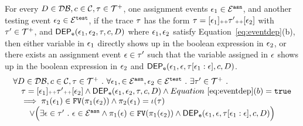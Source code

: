 \begin{lem}
	\label{lem:inv_indepevents_ctl}
	For every $D \in \mathcal{DB} , c \in \mathcal{C}, \mathtt{\tau} \in \mathcal{T}^{+}$, one assignment events 
	$\mathtt{\epsilon}_1\in \mathcal{E}^{\mathtt{{asn}}}$, and another testing event $\mathtt{\epsilon}_2 \in \mathcal{E}^{\mathtt{{test}}}$,
	if the trace $\mathtt{\tau}$ has the form $\mathtt{\tau} = [\mathtt{\epsilon}_1] {\scriptscriptstyle ++} \mathtt{\tau}' {\scriptscriptstyle ++} [\mathtt{\epsilon}_2]$ with $\mathtt{\tau}' \in \mathcal{T}^{+}$, 
	and $\mathsf{DEP_{\mathtt{e}}}(\mathtt{\epsilon}_1, \mathtt{\epsilon}_2, \mathtt{\tau}, c, D)$
	where $\mathtt{\epsilon}_1, \mathtt{\epsilon}_2$ satisfy Equation~\ref{eq:eventdep}(b),
	then either variable in $\mathtt{\epsilon}_1$ directly shows up in the boolean expression 
	in $\mathtt{\epsilon}_2$,
	or there exists an assignment event
	$\mathtt{\epsilon} \in \mathtt{\tau}'$ such that 
	the variable assigned in $\mathtt{\epsilon}$ shows up in the boolean expression 
	in $\mathtt{\epsilon}_2$ and
	$\mathsf{DEP_{\mathtt{e}}}(\mathtt{\epsilon}_1, \mathtt{\epsilon}, \mathtt{\tau}[\mathtt{\epsilon}_1:\mathtt{\epsilon}], c, D)$.
%
\[
\begin{array}{l}
	\forall D \in \mathcal{DB} , c \in \mathcal{C}, \mathtt{\tau} \in \mathcal{T}^{+} ~.~  \forall \mathtt{\epsilon}_1,\in \mathcal{E}^{\mathtt{{asn}}}, \mathtt{\epsilon}_2 \in \mathcal{E}^{\mathtt{{test}}} ~.~ 
	 \exists \mathtt{\tau}' \in \mathcal{T}^{+} ~.~
	 \\ \quad 
	 \mathtt{\tau} = [\mathtt{\epsilon}_1] {\scriptscriptstyle ++} \mathtt{\tau}' {\scriptscriptstyle ++} [\mathtt{\epsilon}_2]
	 \land
	\mathsf{DEP_{\mathtt{e}}}(\mathtt{\epsilon}_1, \mathtt{\epsilon}_2, \mathtt{\tau}, c, D) \land Equation~\ref{eq:eventdep}(b) = \mathtt{true}
	\\ \quad 
	\implies 
	\pi_1(\mathtt{\epsilon}_1) \in \mathtt{FV}(\pi_1(\mathtt{\epsilon}_2)) \land {\pi_2(\ensuremath{\mathtt{\epsilon}}_1)} = \iota(\mathtt{\tau})
	\\ \qquad 
	\lor
	\Big( 
		\exists \mathtt{\epsilon} \in \mathtt{\tau}' ~.~ 
	\mathtt{\epsilon} \in \mathcal{E}^{\mathtt{{asn}}}
	\land 
	\pi_1(\mathtt{\epsilon}) \in \mathtt{FV}(\pi_1(\mathtt{\epsilon}_2)) \land
	\mathsf{DEP_{\mathtt{e}}}(\mathtt{\epsilon}_1, \mathtt{\epsilon}, \mathtt{\tau}[\mathtt{\epsilon}_1:\mathtt{\epsilon}], c, D)
	\Big) 
\end{array}
\]
\end{lem}
%
